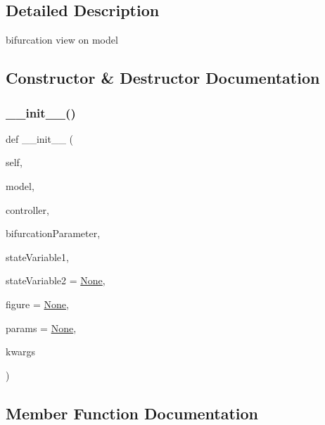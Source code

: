 \subsection{Detailed Description}
bifurcation view on model 

\subsection{Constructor \& Destructor Documentation}
\mbox{\label{class_mu_mo_t_1_1_mu_mo_tbifurcation_view_ac1764fc6547304e629425a5329dc7083}} 
\subsubsection{\texorpdfstring{\+\_\+\+\_\+init\+\_\+\+\_\+()}{\_\_init\_\_()}}
{\footnotesize\ttfamily def \+\_\+\+\_\+init\+\_\+\+\_\+ (\begin{DoxyParamCaption}\item[{}]{self,  }\item[{}]{model,  }\item[{}]{controller,  }\item[{}]{bifurcation\+Parameter,  }\item[{}]{state\+Variable1,  }\item[{}]{state\+Variable2 = {\ttfamily \hyperlink{class_mu_mo_t_1_1_mu_mo_tbifurcation_view_ac7485dcc8d256a6f197ed7802687f252}{None}},  }\item[{}]{figure = {\ttfamily \hyperlink{class_mu_mo_t_1_1_mu_mo_tbifurcation_view_ac7485dcc8d256a6f197ed7802687f252}{None}},  }\item[{}]{params = {\ttfamily \hyperlink{class_mu_mo_t_1_1_mu_mo_tbifurcation_view_ac7485dcc8d256a6f197ed7802687f252}{None}},  }\item[{}]{kwargs }\end{DoxyParamCaption})}



\subsection{Member Function Documentation}
\mbox{\label{class_mu_mo_t_1_1_mu_mo_tbifurcation_view_a385e5f82733060fec5122635ae6a8e67}} 
